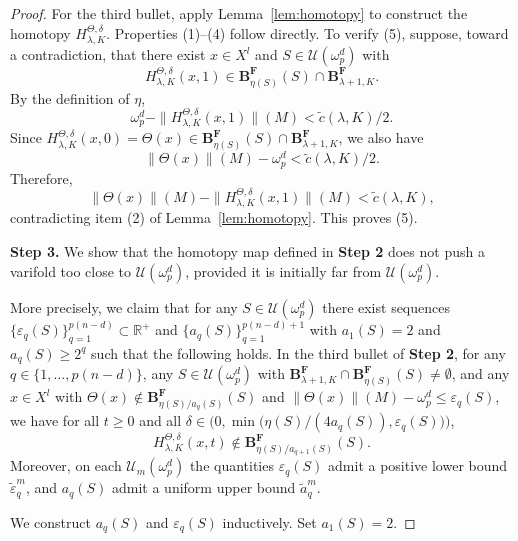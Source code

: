 \documentclass[12pt,english]{article}
\theoremstyle{definition}
\begin{document}
\begin{proof}
For the third bullet, apply Lemma~\ref{lem:homotopy} to construct the homotopy \(H^{\Theta,\delta}_{\lambda,K}\). Properties (1)–(4) follow directly. To verify (5), suppose, toward a contradiction, that there exist \(x\in X^l\) and \(S\in\mathcal{U}(\omega^d_p)\) with
\[
H^{\Theta,\delta}_{\lambda,K}(x,1)\in \mathbf{B}^\mathbf{F}_{\eta(S)}(S)\cap \mathbf{B}^\mathbf{F}_{\lambda+1,K}.
\]
By the definition of \(\eta\),
\[
\omega^d_p-\|H^{\Theta,\delta}_{\lambda,K}(x,1)\|(M)<\tilde c(\lambda,K)/2.
\]
Since \(H^{\Theta,\delta}_{\lambda,K}(x,0)=\Theta(x)\in \mathbf{B}^\mathbf{F}_{\eta(S)}(S)\cap \mathbf{B}^\mathbf{F}_{\lambda+1,K}\), we also have
\[
\|\Theta(x)\|(M)-\omega^d_p<\tilde c(\lambda,K)/2.
\]
Therefore,
\[
\|\Theta(x)\|(M)-\|H^{\Theta,\delta}_{\lambda,K}(x,1)\|(M)<\tilde c(\lambda,K),
\]
contradicting item (2) of Lemma~\ref{lem:homotopy}. This proves (5).

\textbf{Step 3.} We show that the homotopy map defined in \textbf{Step 2} does not push a varifold too close to $\mathcal{U}(\omega^d_p)$, provided it is initially far from $\mathcal{U}(\omega^d_p)$.

More precisely, we claim that for any $S\in\mathcal{U}(\omega^d_p)$ there exist sequences $\{\varepsilon_q(S)\}_{q=1}^{p(n-d)}\subset\mathbb{R}^+$ and $\{a_q(S)\}_{q=1}^{p(n-d)+1}$ with $a_1(S)=2$ and $a_q(S)\ge 2^q$ such that the following holds. In the third bullet of \textbf{Step 2}, for any $q\in\{1,\dots,p(n-d)\}$, any $S\in\mathcal{U}(\omega^d_p)$ with $\mathbf{B}^{\mathbf F}_{\lambda+1,K}\cap \mathbf{B}^{\mathbf F}_{\eta(S)}(S)\neq\emptyset$, and any $x\in X^l$ with $\Theta(x)\notin \mathbf{B}^{\mathbf F}_{\eta(S)/a_q(S)}(S)$ and $\|\Theta(x)\|(M)-\omega^d_p\le \varepsilon_q(S)$, we have for all $t\ge0$ and all $\delta\in\bigl(0,\min\bigl(\eta(S)/(4a_q(S)),\varepsilon_q(S)\bigr)\bigr)$,
\[
    H^{\Theta,\delta}_{\lambda,K}(x,t)\notin \mathbf{B}^{\mathbf F}_{\eta(S)/a_{q+1}(S)}(S).
\]
Moreover, on each $\mathcal{U}_m(\omega^d_p)$ the quantities $\varepsilon_q(S)$ admit a positive lower bound $\tilde\varepsilon^m_q$, and $a_q(S)$ admit a uniform upper bound $\tilde a^m_q$.

We construct $a_q(S)$ and $\varepsilon_q(S)$ inductively. Set $a_1(S)=2$.


\end{proof}
\end{document}
